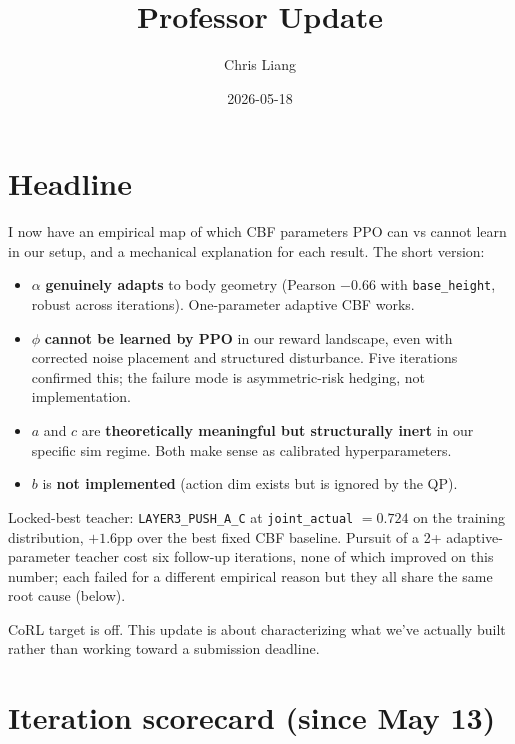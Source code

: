 \documentclass[11pt]{article}
\title{Professor Update}
\author{Chris Liang}
\date{2026-05-18}
\begin{document}
\maketitle

\section*{Headline}

I now have an empirical map of which CBF parameters PPO can vs cannot learn in our setup, and a mechanical explanation for each result. The short version:

\begin{itemize}
\item $\alpha$ \textbf{genuinely adapts} to body geometry (Pearson $-0.66$ with \texttt{base\_height}, robust across iterations). One-parameter adaptive CBF works.
\item $\phi$ \textbf{cannot be learned by PPO} in our reward landscape, even with corrected noise placement and structured disturbance. Five iterations confirmed this; the failure mode is asymmetric-risk hedging, not implementation.
\item $a$ and $c$ are \textbf{theoretically meaningful but structurally inert} in our specific sim regime. Both make sense as calibrated hyperparameters.
\item $b$ is \textbf{not implemented} (action dim exists but is ignored by the QP).
\end{itemize}

Locked-best teacher: \texttt{LAYER3\_PUSH\_A\_C} at \texttt{joint\_actual} $= 0.724$ on the training distribution, $+1.6$pp over the best fixed CBF baseline. Pursuit of a 2+ adaptive-parameter teacher cost six follow-up iterations, none of which improved on this number; each failed for a different empirical reason but they all share the same root cause (below).

CoRL target is off. This update is about characterizing what we've actually built rather than working toward a submission deadline.

\section*{Iteration scorecard (since May 13)}
\end{document}
